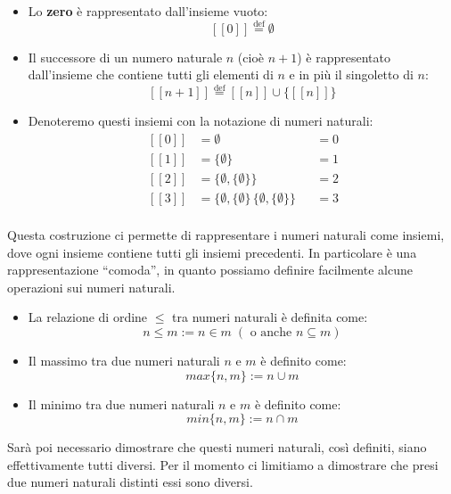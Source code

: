 \documentclass[
  a4paper,
]{article}
\providecommand{\tightlist}{%
  \setlength{\itemsep}{0pt}\setlength{\parskip}{0pt}}
\begin{document}
\begin{itemize}
\tightlist
\item
  Lo \textbf{zero} è rappresentato dall'insieme vuoto: \[
  [[0]] \overset{\mathrm{def}}{=} \emptyset
  \]
\item
  Il successore di un numero naturale \(n\) (cioè \(n+1\)) è
  rappresentato dall'insieme che contiene tutti gli elementi di \(n\) e
  in più il singoletto di \(n\): \[
   [[n+1]] \overset{\mathrm{def}}{=} [[n]] \cup \{[[n]]\}
  \]
\item
  Denoteremo questi insiemi con la notazione di numeri naturali: \[
  \begin{aligned}
  \,[[0]] & = \emptyset && = 0 \\[4pt]
  \,[[1]] & = \{\emptyset\} && = 1 \\[4pt]
  \,[[2]] & = \{\emptyset, \{\emptyset\}\} && = 2 \\[4pt]
  \,[[3]] & = \{\emptyset, \{\emptyset\}\, \{\emptyset, \{\emptyset\}\} && = 3 \\[4pt]
  \end{aligned}
  \]
\end{itemize}

Questa costruzione ci permette di rappresentare i numeri naturali come
insiemi, dove ogni insieme contiene tutti gli insiemi precedenti. In
particolare è una rappresentazione ``comoda'', in quanto possiamo
definire facilmente alcune operazioni sui numeri naturali.

\begin{examplebox}

\begin{itemize}
\tightlist
\item
  La relazione di ordine \(\leq\) tra numeri naturali è definita come:
  \[
  n \leq m := n \in m \; (\text{ o anche } n \subseteq m)
  \]
\item
  Il massimo tra due numeri naturali \(n\) e \(m\) è definito come: \[
  max\{n, m\} := n \cup m
  \]
\item
  Il minimo tra due numeri naturali \(n\) e \(m\) è definito come: \[
  min\{n, m\} := n \cap m
  \]
\end{itemize}

\end{examplebox}

Sarà poi necessario dimostrare che questi numeri naturali, così
definiti, siano effettivamente tutti diversi. Per il momento ci
limitiamo a dimostrare che presi due numeri naturali distinti essi sono
diversi.
\end{document}
